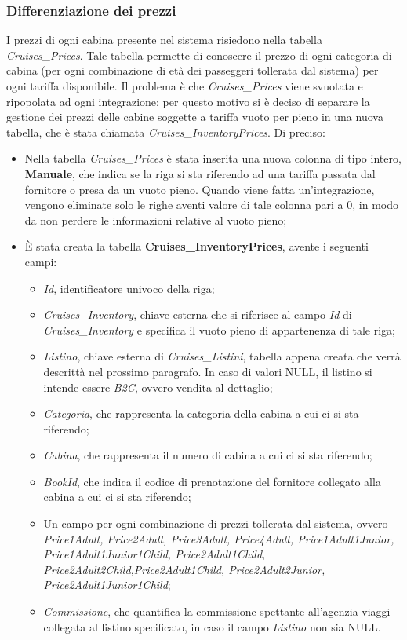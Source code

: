 \subsubsection{Differenziazione dei prezzi}
I prezzi di ogni cabina presente nel sistema risiedono nella tabella \textit{Cruises\_Prices}. Tale tabella permette di conoscere il prezzo di ogni categoria di cabina (per ogni combinazione di età dei passeggeri tollerata dal sistema) per ogni \gls{tariffa} disponibile. Il problema è che \textit{Cruises\_Prices} viene svuotata e ripopolata ad ogni integrazione: per questo motivo si è deciso di separare la gestione dei prezzi delle cabine soggette a tariffa vuoto per pieno in una nuova tabella, che è stata chiamata \textit{Cruises\_InventoryPrices}. Di preciso:
\begin{itemize}
	\item Nella tabella \textit{Cruises\_Prices} è stata inserita una nuova colonna di tipo intero, \textbf{Manuale}, che indica se la riga si sta riferendo ad una tariffa passata dal fornitore o presa da un vuoto pieno. Quando viene fatta un'integrazione, vengono eliminate solo le righe aventi valore di tale colonna pari a 0, in modo da non perdere le informazioni relative al vuoto pieno;
	\item È stata creata la tabella \textbf{Cruises\_InventoryPrices}, avente i seguenti campi:
		\begin{itemize}
			\item \textit{Id}, identificatore univoco della riga;
			\item \textit{Cruises\_Inventory}, chiave esterna che si riferisce al campo \textit{Id} di \textit{Cruises\_Inventory} e specifica il vuoto pieno di appartenenza di tale riga;
			\item \textit{Listino}, chiave esterna di \textit{Cruises\_Listini}, tabella appena creata che verrà descrittà nel prossimo paragrafo. In caso di valori NULL, il listino si intende essere \textit{B2C}, ovvero vendita al dettaglio;
			\item \textit{Categoria}, che rappresenta la categoria della cabina a cui ci si sta riferendo;
			\item \textit{Cabina}, che rappresenta il numero di cabina a cui ci si sta riferendo;
			\item \textit{BookId}, che indica il codice di prenotazione del fornitore collegato alla cabina a cui ci si sta riferendo;
			\item Un campo per ogni combinazione di prezzi tollerata dal sistema, ovvero \textit{Price1Adult, Price2Adult, Price3Adult, Price4Adult, Price1Adult1Junior, Price1Adult1Junior1Child, Price2Adult1Child, Price2Adult2Child,Price2Adult1Child, Price2Adult2Junior, Price2Adult1Junior1Child};
			\item \textit{Commissione}, che quantifica la commissione spettante all'agenzia viaggi collegata al listino specificato, in caso il campo \textit{Listino} non sia NULL.
		\end{itemize}
\end{itemize}
